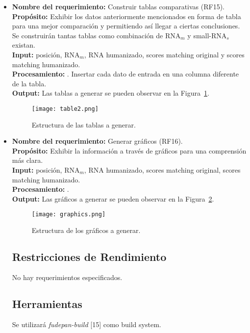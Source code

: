 \documentclass[12pt,a4paper,spanish]{article}
\begin{document}
\begin{itemize}
		\item \textbf{Nombre del requerimiento:} Construir tablas comparativas (RF15).\\
 	    \textbf{Propósito:} Exhibir los datos anteriormente mencionados en forma de tabla para una mejor comparación y 								permitiendo así llegar a ciertas conclusiones. Se construirán tantas tablas como combinación 								de RNA$_m$ y small-RNA$_s$ existan.\\
		\textbf{Input:} posición, RNA$_m$, RNA humanizado, scores matching original y scores matching humanizado.\\
		\textbf{Procesamiento:} . Insertar cada dato de entrada en una columna diferente de la tabla.\\
		\textbf{Output:} Las tablas a generar se pueden observar en la Figura~\ref{table}.
			\vskip 0.5cm
			\begin{figure}[h]
				\begin{center}
					\texttt{[image: table2.png]}
					\caption{Estructura de las tablas a generar.}
					\label{table}
				\end{center}
			\end{figure}
		
		\item \textbf{Nombre del requerimiento:} Generar gráficos (RF16).\\
 	    \textbf{Propósito:} Exhibir la información a través de gráficos para una comprensión más clara.\\
		\textbf{Input:} posición, RNA$_m$, RNA humanizado, scores matching original, scores matching humanizado. \\
		\textbf{Procesamiento:} .\\
		\textbf{Output:} Las gráficos a generar se pueden observar en la Figura~\ref{graphic}.
			\begin{figure}[h]
				\begin{center}
					\texttt{[image: graphics.png]}
					\caption{Estructura de los gráficos a generar.}
					\label{graphic}
				\end{center}
			\end{figure}

\subsection{Restricciones de Rendimiento}
No hay requerimientos especificados.

\subsection{Herramientas}
	Se utilizará \textit{fudepan-build} [15] como build system.


\end{itemize}
\end{document}
